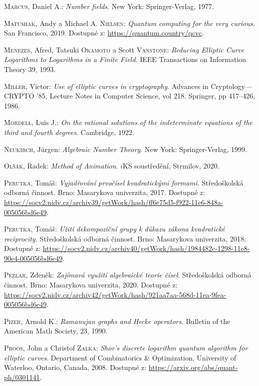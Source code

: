 \documentclass[12pt]{report}
\begin{document}
\begin{thebibliography}{97}
\textsc{Marcus}, Daniel A.: \textit{Number fields}. New York: Springer-Verlag, 1977.

\textsc{Matushak}, Andy a Michael A. \textsc{Nielsen}: \textit{Quantum computing for the very curious}. San Francisco, 2019. Dostupné z: \url{https://quantum.country/qcvc}.

\textsc{Menezes}, Afred, Tatsuki \textsc{Okamoto} a Scott \textsc{Vanstone}: \textit{Reducing Elliptic Curve Logarithms to Logarithms in a Finite Field}. IEEE Transactions on Information Theory 39, 1993.

\textsc{Miller}, Victor: \textit{Use of elliptic curves in cryptography}. Advances in Cryptology—CRYPTO ’85, Lecture Notes in Computer Science, vol 218. Springer, pp 417–426, 1986.

\textsc{Mordell}, Luis J.: \textit{On the rational solutions of the indeterminate equations of the third and fourth degrees}. Cambridge, 1922.

\textsc{Neukirch}, J{\"u}rgen: \textit{Algebraic Number Theory}. New York: Springer-Verlag, 1999.

\textsc{Olšák}, Radek: \textit{Method of Animation}. $i$KS soustředění, Strmilov, 2020.

\textsc{Perutka}, Tomáš: \textit{Vyjadřování prvočísel kvadratickými formami.} Středoškolská odborná činnost. Brno: Masarykova univerzita, 2017. Dostupné z: \url{https://socv2.nidv.cz/archiv39/getWork/hash/ff6e75d5-f922-11e6-848a-005056bd6e49}.

\textsc{Perutka}, Tomáš: \textit{Užití dekompoziční grupy k důkazu zákona kvadratické reciprocity.} Středoškolská odborná činnost. Brno: Masarykova univerzita, 2018. Dostupné z: \url{https://socv2.nidv.cz/archiv40/getWork/hash/1984482c-1298-11e8-90e4-005056bd6e49}.


\textsc{Pezlar}, Zdeněk: \textit{Zajímavá využití algebraické teorie čísel}. Středoškolská odborná činnost. Brno: Masarykova univerzita, 2020. Dostupné z: \url{https://socv2.nidv.cz/archiv42/getWork/hash/921aa7aa-568d-11ea-9fea-005056bd6e49}.

\textsc{Pizer}, Arnold K.: \textit{Ramanujan graphs and Hecke operators.} Bulletin of the American Math Society, 23, 1990.

\textsc{Proos}, John a Christof \textsc{Zalka}: \textit{Shor’s discrete logarithm quantum algorithm for elliptic curves}. Department of Combinatorics \& Optimization, University of Waterloo,  Ontario, Canada, 2008. Dostupné z: \url{https://arxiv.org/abs/quant-ph/0301141}.


\end{thebibliography}
\end{document}
